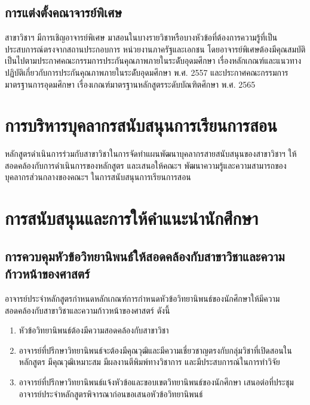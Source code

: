\subsection{การแต่งตั้งคณาจารย์พิเศษ}
สาขาวิชาฯ มีการเชิญอาจารย์พิเศษ
มาสอนในบางรายวิชาหรือบางหัวข้อที่ต้องการความรู้ที่เป็นประสบการณ์ตรงจากสถานประกอบการ หน่วยงานภาครัฐและเอกชน โดยอาจารย์พิเศษต้องมีคุณสมบัติเป็นไปตามประกาศคณะกรรมการประกันคุณภาพภายในระดัับอุดมศึกษา เรื่องหลักเกณฑ์และแนวทางปฏิบัติเกี่ยวกับการประกันคุณภาพภายในระดัับอุดมศึกษา พ.ศ. 2557 และประกาศคณะกรรมการมาตรฐานการอุดมศึกษา เรื่องเกณฑ์มาตรฐานหลักสูตรระดับบัณฑิตศึกษา พ.ศ. 2565

\section{การบริหารบุคลากรสนับสนุนการเรียนการสอน}
หลักสูตรดำเนินการร่วมกับสาขาวิชาในการจัดทำแผนพัฒนาบุคลากรสายสนับสนุนของสาขาวิชาฯ ให้สอดคล้องกับการดำเนินการของหลักสูตร และเสนอให้คณะฯ พัฒนาความรู้และความสามารถของบุคลากรส่วนกลางของคณะฯ ในการสนับสนุนการเรียนการสอน

 \section{การสนับสนุนและการให้คำแนะนำนักศึกษา}
 \subsection{การควบคุมหัวข้อวิทยานิพนธ์ให้สอดคล้องกับสาขาวิชาและความก้าวหน้าของศาสตร์}
 อาจารย์ประจำหลักสูตรกำหนดหลักเกณฑ์การกำหนดหัวข้อวิทยานิพนธ์ของนักศึกษาให้มีความสอดคล้องกับสาขาวิชาและความก้าวหน้าของศาสตร์ ดังนี้
  \begin{enumerate}
   	\item หัวข้อวิทยานิพนธ์ต้องมีความสอดคล้องกับสาขาวิชา\thdegreebranch
   	\item อาจารย์ที่ปรึกษาวิทยานิพนธ์จะต้องมีคุณวุฒิและมีความเชี่ยวชาญตรงกับกลุ่มวิชาที่เปิดสอนในหลักสูตร มีคุณวุฒิเหมาะสม มีผลงานตีพิมพ์ทางวิชาการ และมีประสบการณ์ในการทำวิจัย   	
   	\item  อาจารย์ที่ปรึกษาวิทยานิพนธ์แจ้งหัวข้อและขอบเขตวิทยานิพนธ์ของนักศึกษา เสนอต่อที่ประชุมอาจารย์ประจำหลักสูตรพิจารณาก่อนขอเสนอหัวข้อวิทยานิพนธ์  	
   	\end{enumerate}  
  
